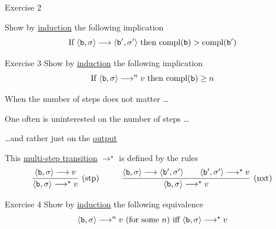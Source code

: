 \documentclass{beamer}
\begin{document}
\begin{frame}{Exercise 2}

        Show by \alert{\underline{induction}} the following 
        implication
        \[
                \text{If } \langle \mathtt{b}, \sigma \rangle \longrightarrow \langle \mathtt{b}', \sigma' \rangle 
                \text{ then }
                \mathrm{compl}(\mathtt{b}) > \mathrm{compl}(\mathtt{b}')
       \]
\end{frame}

\begin{frame}{Exercise 3}
        Show by \alert{\underline{induction}} the following 
        implication
        \[
                \text{If } \langle \mathtt{b}, \sigma \rangle \longrightarrow^n v 
                \text{ then }
                \mathrm{compl}(\mathtt{b}) \geq n 
       \]
\end{frame}

\begin{frame}{When the number of steps does not matter \dots}

        One often is uninterested on the number of steps \dots

        \dots and rather just on the \alert{\underline{output}}

        \pause
        \bigskip
        This \alert{\underline{multi-step transition}}  $\longrightarrow^\star$
        is defined by the rules 
        \smallskip
        \[
                \infer[\text{(stp)}]{ 
                        \pv{\prog{b}}{\sigma} \longrightarrow^\star v 
                }{
                        \pv{\prog{b}}{\sigma} \longrightarrow v 
                }
                \hspace{1cm}
                \infer[\text{(nxt)}]{ 
                        \pv{\prog{b}}{\sigma} \longrightarrow^\star v 
                }{
                        \pv{\prog{b}}{\sigma} \longrightarrow 
                        \pv{\prog{b'}}{\sigma'} 
                        \qquad
                        \pv{\prog{b'}}{\sigma'} \longrightarrow^\star v
                }
        \]

\end{frame}

\begin{frame}{Exercise 4}
        Show by \alert{\underline{induction}} the following 
        equivalence
        \[
                \langle \mathtt{b}, \sigma \rangle \longrightarrow^n v\
                 (\text{for some } n)
                \text{ iff }
                \langle \mathtt{b}, \sigma \rangle \longrightarrow^\star v 
       \]
\end{frame}
\end{document}
